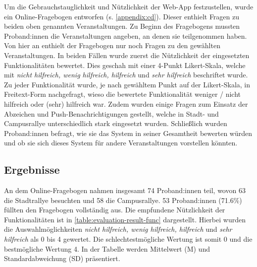 Um die Gebrauchstauglichkeit und Nützlichkeit der Web-App festzustellen, wurde
ein Online-Fragebogen entworfen (s. \autoref{appendix:cd}). Dieser enthielt
Fragen zu beiden oben genannten Veranstaltungen. Zu Beginn des Fragebogens
mussten Proband:innen die Veranstaltungen angeben, an denen sie teilgenommen
haben. Von hier an enthielt der Fragebogen nur noch Fragen zu den gewählten
Veranstaltungen. In beiden Fällen wurde zuerst die Nützlichkeit der eingesetzten
Funktionalitäten bewertet. Dies geschah mit einer 4-Punkt Likert-Skala, welche
mit \textit{nicht hilfreich, wenig hilfreich, hilfreich} und \textit{sehr
hilfreich} beschriftet wurde. Zu jeder Funktionalität wurde, je nach gewähltem
Punkt auf der Likert-Skala, in Freitext-Form nachgefragt, wieso die bewertete
Funktionalität weniger / nicht hilfreich oder (sehr) hilfreich war. Zudem wurden
einige Fragen zum Einsatz der Abzeichen und Push-Benachrichtigungen gestellt,
welche in Stadt- und Campusrallye unterschiedlich stark eingesetzt wurden.
Schließlich wurden Proband:innen befragt, wie sie das System in seiner
Gesamtheit bewerten würden und ob sie sich dieses System für andere
Veranstaltungen vorstellen könnten.


\subsection{Ergebnisse} \label{ssec:eval-t-results}

An dem Online-Fragebogen nahmen insgesamt 74 Proband:innen teil, wovon 63 die
Stadtrallye besuchten und 58 die Campusrallye. 53 Proband:innen (71.6\%) füllten
den Fragebogen vollständig aus. Die empfundene Nützlichkeit der Funktionalitäten
ist in \autoref{table:evaluation-result-func} dargestellt. Hierbei wurden die
Auswahlmöglichkeiten \textit{nicht hilfreich, wenig hilfreich, hilfreich} und
\textit{sehr hilfreich} als 0 bis 4 gewertet. Die schlechtestmögliche Wertung
ist somit 0 und die bestmögliche Wertung 4. In der Tabelle werden Mittelwert (M)
und Standardabweichung (SD) präsentiert.


